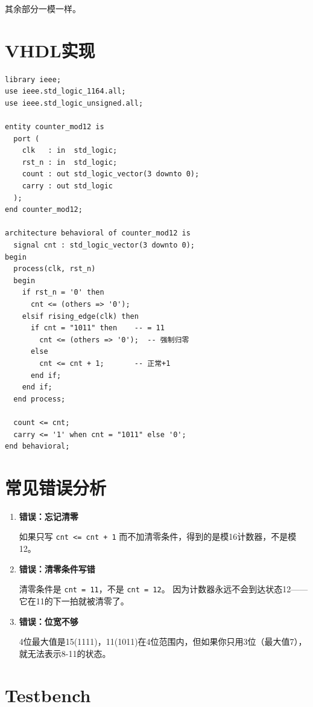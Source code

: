其余部分一模一样。

\section{VHDL实现}

\begin{lstlisting}[caption={模12计数器}]
library ieee;
use ieee.std_logic_1164.all;
use ieee.std_logic_unsigned.all;

entity counter_mod12 is
  port (
    clk   : in  std_logic;
    rst_n : in  std_logic;
    count : out std_logic_vector(3 downto 0);
    carry : out std_logic
  );
end counter_mod12;

architecture behavioral of counter_mod12 is
  signal cnt : std_logic_vector(3 downto 0);
begin
  process(clk, rst_n)
  begin
    if rst_n = '0' then
      cnt <= (others => '0');
    elsif rising_edge(clk) then
      if cnt = "1011" then    -- = 11
        cnt <= (others => '0');  -- 强制归零
      else
        cnt <= cnt + 1;       -- 正常+1
      end if;
    end if;
  end process;

  count <= cnt;
  carry <= '1' when cnt = "1011" else '0';
end behavioral;
\end{lstlisting}

\section{常见错误分析}

\begin{examtip}[模12计数器的常见错误]
\begin{enumerate}
  \item \textbf{错误：忘记清零}

  如果只写 \texttt{cnt <= cnt + 1} 而不加清零条件，得到的是模16计数器，不是模12。

  \item \textbf{错误：清零条件写错}

  清零条件是 \texttt{cnt = 11}，不是 \texttt{cnt = 12}。
  因为计数器永远不会到达状态12——它在11的下一拍就被清零了。

  \item \textbf{错误：位宽不够}

  4位最大值是15(1111)，11(1011)在4位范围内，但如果你只用3位（最大值7），就无法表示8-11的状态。
\end{enumerate}
\end{examtip}

\section{Testbench}

